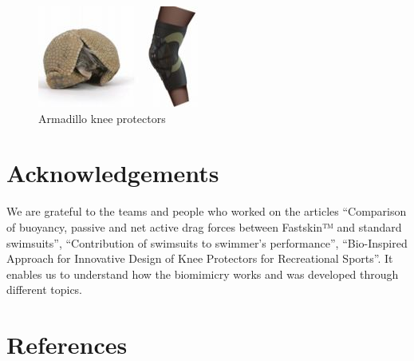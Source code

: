 \documentclass[twoside,twocolumn]{article}                          %
\begin{document}
\begin{figure}[!h]
  \begin{center}
    \includegraphics[scale=1]{arma.JPG}
  \end{center}
  \caption{Armadillo knee protectors}
  \end{figure} 

\section{Acknowledgements}
We are grateful to the teams and people who worked on the articles “Comparison of buoyancy, passive and net active drag forces between Fastskin™\cite{Fastskin} and standard swimsuits”, “Contribution of swimsuits to swimmer’s performance”\cite{Swimsuits}, “Bio-Inspired Approach for Innovative Design of Knee Protectors for Recreational Sports”\cite{armadillo}. It enables us to understand how the biomimicry works and was developed through different topics. 

\section{References}


\end{document}
